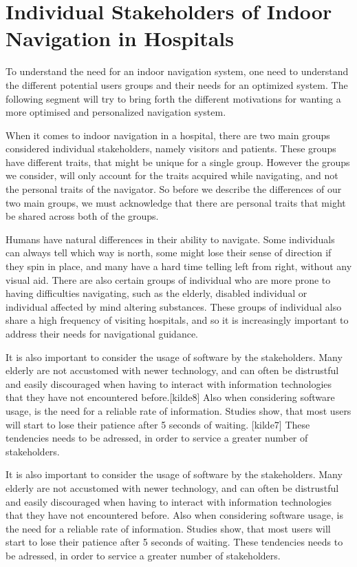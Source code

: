 \section{Individual Stakeholders of Indoor Navigation in Hospitals} %
\label{sec:interusers}

To understand the need for an indoor navigation system, one need to understand the different potential users groups and their needs for an optimized system. The following segment will try to bring forth the different motivations for wanting a more optimised and personalized navigation system.

When it comes to indoor navigation in a hospital, there are two main groups considered individual stakeholders, namely visitors and patients. These groups have different traits, that might be unique for a single group. However the groups we consider, will only account for the traits acquired while navigating, and not the personal traits of the navigator. So before we describe the differences of our two main groups, we must acknowledge that there are personal traits that might be shared across both of the groups.

Humans have natural differences in their ability to navigate. Some individuals can always tell which way is north, some might lose their sense of direction if they spin in place, and many have a hard time telling left from right, without any visual aid.\cite{naturtalenter} There are also certain groups of individual who are more prone to having difficulties navigating, such as the elderly, disabled individual or individual affected by mind altering substances.\cite{MCI} These groups of individual also share a high frequency of visiting hospitals, and so it is increasingly important to address their needs for navigational guidance.\cite{generel}

It is also important to consider the usage of software by the stakeholders. Many elderly are not accustomed with newer technology, and can often be distrustful and easily discouraged when having to interact with information technologies that they have not encountered before.[kilde8] Also when considering software usage, is the need for a reliable rate of information. Studies show, that most users will start to lose their patience after 5 seconds of waiting. [kilde7] These tendencies needs to be adressed, in order to service a greater number of stakeholders.

It is also important to consider the usage of software by the stakeholders. Many elderly are not accustomed with newer technology, and can often be distrustful and easily discouraged when having to interact with information technologies that they have not encountered before.\cite{gamle_teknologi} Also when considering software usage, is the need for a reliable rate of information. Studies show, that most users will start to lose their patience after 5 seconds of waiting. \cite{ventetid} These tendencies needs to be adressed, in order to service a greater number of stakeholders.

